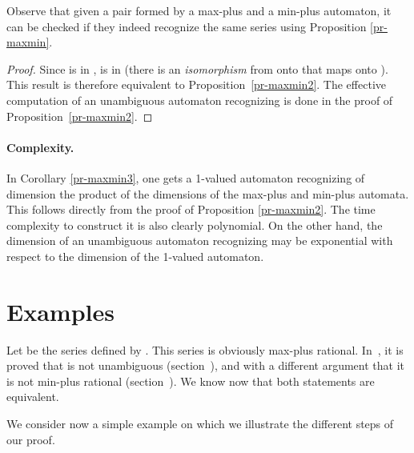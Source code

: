 \documentclass{article}
\newcommand{\1}{\mathbb{1}}
\newcommand{\0}{\mathbb{0}}
\begin{document}
Observe that given a pair
formed by a max-plus and a min-plus automaton, it can be checked if
they indeed recognize the same series using Proposition
\ref{pr-maxmin}. 

\begin{proof}
Since  is in ,
 is in  (there is an {\it isomorphism}
from  onto  that maps  onto ). This result is
therefore equivalent to Proposition~\ref{pr-maxmin2}. The effective
computation of an unambiguous automaton recognizing  is done in the
proof of Proposition~\ref{pr-maxmin2}. 
\end{proof}

\paragraph{Complexity.} In Corollary \ref{pr-maxmin3}, one gets 
a 1-valued automaton recognizing  of dimension the product of the dimensions
of the max-plus and min-plus automata. This follows directly from the proof of
Proposition \ref{pr-maxmin2}. The time complexity to construct it is
also clearly polynomial. 
On the other hand, the dimension of an unambiguous automaton
recognizing  may be exponential with respect to the dimension of
the 1-valued automaton. 

\section{Examples}

Let  be the series defined by .
This series is obviously max-plus rational. In~\cite{KLMP04}, it is proved 
that  is not unambiguous (section~),
and with a different argument that it is not min-plus rational (section~).
We know now that both statements are equivalent.

\medskip

We consider now a simple example on which we illustrate the different
steps of our proof. 

\medskip
\end{document}
